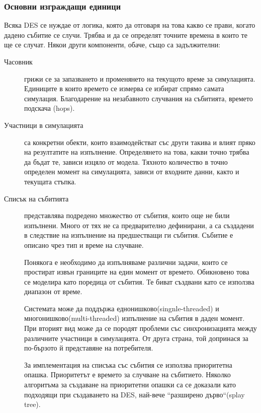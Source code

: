 		\subsubsection{Основни изграждащи единици}	
			Всяка \ac{DES} се нуждае от логика, която да отговаря на това какво се прави, когато
			дадено събитие се случи. Трябва и да се определят точните времена в които те ще се случат.
			Някои други компоненти, обаче, също са задължителни:
			
			\begin{description}
			
				\item[Часовник] грижи се за запазването и променянето на текущото време за симулацията.
				Единиците в които времето се измерва се избират спрямо самата симулация.
				Благодарение на незабавното случвания на събитията, времето подскача (hops).
				
				\item[Участници в симулацията] са конкретни обекти, които взаимодействат със други такива и 
				влият пряко на резултатите на изпълнение. Определянето на това, какви точно трябва да бъдат те,
				зависи изцяло от модела. Тяхното количество в точно определен момент на симулацията,
				зависи от входните данни, както и текущата стъпка.
				
				\item[Списък на събитията] представлява подредено множество от събития, които още не били
				изпълнени. Много от тях не са предварително дефинирани, а са създадени в следствие на
				изпълнение на предшестващи ги събития. Събитие е описано чрез тип и време на случване. 
				
				Понякога е необходимо да изпълняваме различни задачи, които се простират извън границите
				на един момент от времето. Обикновено това се моделира като поредица от събития.
				Те биват създвани като се използва диапазон от време.
				
				Системата може да поддържа еднонишково(singnle-threaded) и\\
				многонишково(multi-threaded) изпълнение на събития в даден момент. 
				При вторият вид може да се породят проблеми със 
				синхронизацията между различните участници в симулацията. От друга страна,
				той допринася за по-бързото й представяне на потребителя.
				
				За имплементация на списъка със събития се използва приоритетна опашка. Приоритетът е
				времето за случване на събитието. Няколко алгоритъма за създаване на приоритетни опашки
				са се доказали като подходящи при създаването на \ac{DES}\cite{Jones}, най-вече ``разширено дърво``(splay tree).
				

\end{description}
